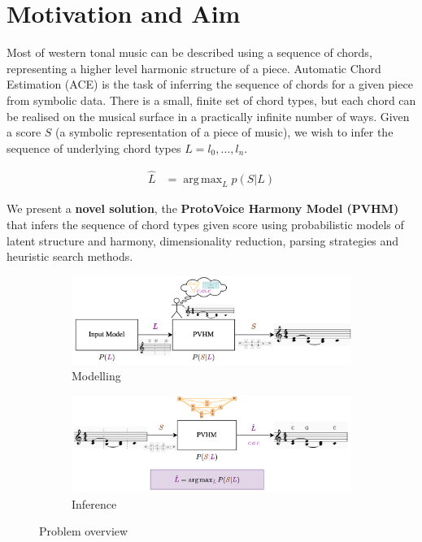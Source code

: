 \documentclass[12pt,a4paper,twoside,openright]{report}
\DeclareMathOperator*{\argmax}{arg\,max}
\theoremstyle{definition}
\begin{document}
\section{Motivation and Aim}
Most of western tonal music can be described using a sequence of chords, representing a higher level harmonic structure of a piece. Automatic Chord Estimation (ACE) is the task of inferring the sequence of chords for a given piece from symbolic data. There is a small, finite set of chord types, but each chord can be realised on the musical surface in a practically infinite number of ways. Given a score $S$ (a symbolic representation of a piece of music), we wish to infer the sequence of underlying chord types $L = l_0, \dots, l_n$. 

\begin{equation}
  \begin{align}
    \hat L &= \argmax_L p(S|L) 
  \end{align}
\end{equation} 

We present a \textbf{novel solution}, the \textbf{ProtoVoice Harmony Model (PVHM)} that infers the sequence of chord types given score using probabilistic models of latent structure and harmony, dimensionality reduction, parsing strategies and heuristic search methods.

\begin{figure}[h]
  \centering
  \begin{subfigure}[t]{\textwidth}
    \centering\includegraphics[keepaspectratio,width=\textwidth]{intro/overview/generation}
    \caption{Modelling}
    \label{fig:modellingOverview}
  \end{subfigure}
  \begin{subfigure}[t]{\textwidth}
    \centering\includegraphics[keepaspectratio,width=\textwidth]{intro/overview/inference}
    \caption{Inference}
    \label{fig:inferenceOverview}
  \end{subfigure}
  \caption{Problem overview}
  \label{fig:overview}
\end{figure}
\end{document}
